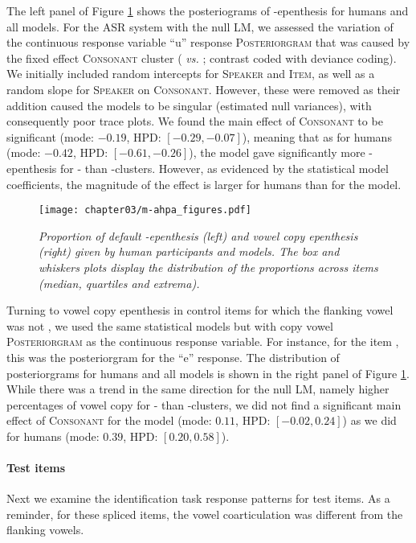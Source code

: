 {The left panel of Figure \ref{fig:m-ahpa_ctrl} shows the posteriograms of -epenthesis for humans and all models. For the ASR system with the null LM, we assessed the variation of the continuous response variable ``u'' response \textsc{Posteriorgram} that was caused by the fixed effect \textsc{Consonant} cluster ( \textit{vs.} ; contrast coded with deviance coding).
We initially included random intercepts for \textsc{Speaker} and \textsc{Item}, as well as a random slope for \textsc{Speaker} on \textsc{Consonant}. However, these were removed as their addition caused the models to be singular (estimated null variances), with consequently poor trace plots.
We found the main effect of \textsc{Consonant} to be significant (mode: $-0.19$, HPD: $[-0.29,-0.07]$), meaning that as for humans (mode: $-0.42$, HPD: $[-0.61,-0.26]$), the model gave significantly more -epenthesis for - than -clusters. However, as evidenced by the statistical model coefficients, the magnitude of the effect is larger for humans than for the model.  

\begin{figure}[htb]
\centering
\texttt{[image: chapter03/m-ahpa\_figures.pdf]}
\caption{\textit{Proportion of default -epenthesis (left) and vowel copy epenthesis (right) given by human participants and models. The box and whiskers plots display the distribution of the proportions across items (median, quartiles and extrema).}}
\label{fig:m-ahpa_ctrl}
\end{figure}

Turning to vowel copy epenthesis in control items for which the flanking vowel was not , we used the same statistical models but with copy vowel \textsc{Posteriorgram} as the continuous response variable. For instance, for the item , this was the posteriorgram for the ``e'' response. The distribution of posteriorgrams for humans and all models is shown in the right panel of Figure \ref{fig:m-ahpa_ctrl}.
While there was a trend in the same direction for the null LM, namely higher percentages of vowel copy for - than -clusters, we did not find a significant main effect of \textsc{Consonant} for the model (mode: $0.11$, HPD: $[-0.02, 0.24]$) as we did for humans (mode: $0.39$, HPD: $[0.20, 0.58]$). 

\paragraph{Test items}
Next we examine the identification task response patterns for test items. As a reminder, for these spliced items, the vowel coarticulation was different from the flanking vowels.

}
